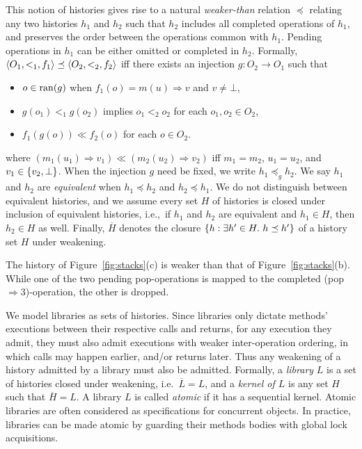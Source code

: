 This notion of histories gives rise to a natural \emph{weaker-than} relation
$\preceq$ relating any two histories $h_1$ and $h_2$ such that $h_2$ includes
all completed operations of $h_1$, and preserves the order between the
operations common with $h_1$. Pending operations in $h_1$ can be either omitted
or completed in $h_2$. Formally, ${\langle{O_1, <_1, f_1}\rangle} \preceq {\langle{O_2, <_2,
f_2}\rangle}$ if{f} there exists an injection $g: O_2 \to O_1$ such that
\begin{itemize}

  \item $o \in \operatorname{ran}(g)$ when $f_1(o) = m(u) \Rightarrow v$ and $v \neq \bot$,

  \item $g(o_1) <_1 g(o_2)$ implies $o_1 <_2 o_2$ for each $o_1, o_2 \in O_2$,

  \item $f_1(g(o)) \ll f_2(o)$ for each $o \in O_2$.

\end{itemize}
where $(m_1(u_1) \Rightarrow v_1) \ll (m_2(u_2) \Rightarrow v_2)$ if{f} $m_1 =
m_2$, $u_1 = u_2$, and $v_1 \in {\{  v_2, \bot  \}}$. When the injection $g$ need
be fixed, we write $h_1 \preceq_g h_2$. We say $h_1$ and $h_2$ are
\emph{equivalent} when $h_1 \preceq h_2$ and $h_2 \preceq h_1$. We do not
distinguish between equivalent histories, and we assume every set $H$ of
histories is closed under inclusion of equivalent histories, i.e.,~if $h_1$ and
$h_2$ are equivalent and $h_1 \in H$, then $h_2 \in H$ as well. Finally,
$\overline{H}$ denotes the closure ${\{  h : \exists h' \in H.\ h \preceq h'
 \}}$ of a history set $H$ under weakening.

\begin{example}

  The history of Figure~\ref{fig:stacks}(c) is weaker than that of
  Figure~\ref{fig:stacks}(b). While one of the two pending pop-operations is
  mapped to the completed (pop $\Rightarrow 3$)-operation, the other is dropped.

\end{example}

We model libraries as sets of histories. Since libraries only dictate methods'
executions between their respective calls and returns, for any execution they
admit, they must also admit executions with weaker inter-operation ordering, in
which calls may happen earlier, and/or returns later. Thus any weakening of a
history admitted by a library must also be admitted. Formally, a \emph{library}
$L$ is a set of histories closed under weakening, i.e.~$\overline{L} = L$, and
a \emph{kernel of $L$} is any set $H$ such that $\overline{H} = L$. A library
$L$ is called \emph{atomic} if it has a sequential kernel. Atomic libraries are
often considered as specifications for concurrent objects. In practice,
libraries can be made atomic by guarding their methods bodies with global lock
acquisitions.

